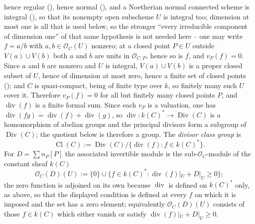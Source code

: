 \begin{definition}
hence regular (), hence normal
(), and a Noetherian normal connected
scheme is integral (), so
that its nonempty open subscheme \(U\) is integral too; dimension at
most one is all that is used below, so the stronger ``every irreducible
component of dimension one'' of that same hypothesis is not needed here
-- one may write
\(f=a/b\) with \(a,b\in\mathcal O_C(U)\) nonzero; at a closed point
\(P\in U\) outside \(V(a)\cup V(b)\) both \(a\) and \(b\) are units
in \(\mathcal O_{C,P}\), hence so is \(f\), and \(v_P(f)=0\).  Since
\(a\) and \(b\) are nonzero and \(U\) is integral, \(V(a)\cup V(b)\)
is a proper closed subset of \(U\), hence of dimension at most zero, hence
a finite set of closed points (); and \(C\) is
quasi-compact, being of finite type over \(k\), so finitely many such \(U\)
cover it.  Therefore \(v_P(f)=0\) for all but finitely many closed points
\(P\), and \(\operatorname{div}(f)\) is a finite formal sum.  Since each
\(v_P\) is a valuation, one has
\(\operatorname{div}(fg)=\operatorname{div}(f)+\operatorname{div}(g)\),
so \(\operatorname{div}:k(C)^*\to\operatorname{Div}(C)\) is a
homomorphism of abelian groups and the principal divisors form a
subgroup of \(\operatorname{Div}(C)\); the quotient below is
therefore a group.
The \emph{divisor class group} is
\[
 \operatorname{Cl}(C):=\operatorname{Div}(C)/\{\operatorname{div}(f):f\in k(C)^*\}.
\]
For \(D=\sum n_P[P]\) the associated invertible module is the
sub-\(\mathcal O_C\)-module of the constant sheaf \(k(C)\)
\[
 \mathcal O_C(D)(U):=\{0\}\cup
 \{f\in k(C)^*:\operatorname{div}(f)|_U+D|_U\geq0\};
\]
the zero function is adjoined on its own because \(\operatorname{div}\)
is defined on \(k(C)^*\) only, as above, so that the displayed condition
is defined at every \(f\) on which it is imposed and the set has a zero
element; equivalently \(\mathcal O_C(D)(U)\) consists of those
\(f\in k(C)\) which either vanish or satisfy
\(\operatorname{div}(f)|_U+D|_U\geq0\).


\end{definition}
